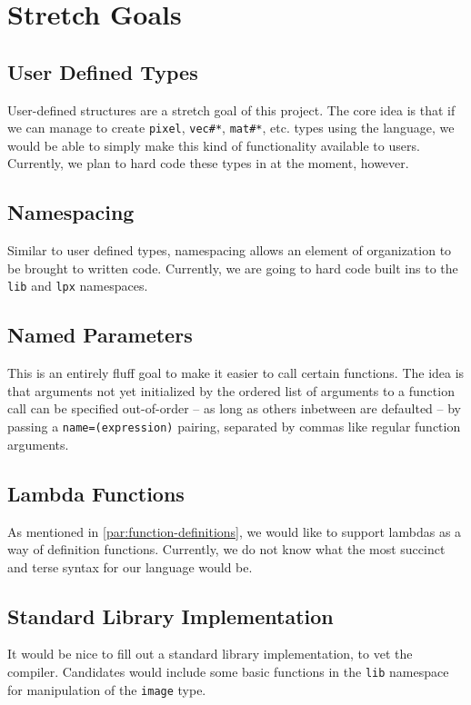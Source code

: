 \chapter{Stretch Goals}
\section{User Defined Types}
\label{sec:stretch user defined types}
User-defined structures are a stretch goal of this project. The core idea is that if we can manage to create \lstinline|pixel|, \lstinline|vec#*|, \lstinline|mat#*|, etc. types using the language, we would be able to simply make this kind of functionality available to users. Currently, we plan to hard code these types in at the moment, however.

\section{Namespacing}
\label{sec:stretch namespacing}
Similar to user defined types, namespacing allows an element of organization to be brought to written code. Currently, we are going to hard code built ins to the \lstinline|lib| and \lstinline|lpx| namespaces.

\section{Named Parameters}
This is an entirely fluff goal to make it easier to call certain functions. The idea is that arguments not yet initialized by the ordered list of arguments to a function call can be specified out-of-order -- as long as others inbetween are defaulted -- by passing a \lstinline|name=(expression)| pairing, separated by commas like regular function arguments.

\section{Lambda Functions}
As mentioned in \ref{par:function-definitions}, we would like to support lambdas as a way of definition functions. Currently, we do not know what the most succinct and terse syntax for our language would be.

\section{Standard Library Implementation}
It would be nice to fill out a standard library implementation, to vet the \lepix{} compiler. Candidates would include some basic functions in the \lstinline|lib| namespace for manipulation of the \lstinline|image| type.


